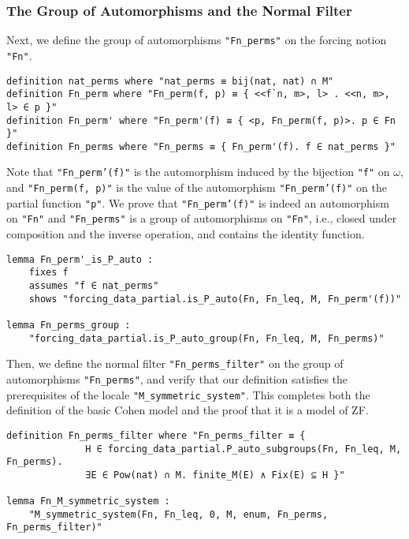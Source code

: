 \documentclass{report}
\newenvironment{isaframe}{\begin{mdframed}[topline=false, rightline=false, bottomline=false]}{\end{mdframed}}
\begin{document}
\subsubsection{The Group of Automorphisms and the Normal Filter}
Next, we define the group of automorphisms \texttt{"Fn\_perms"} on the forcing notion \texttt{"Fn"}.
\begin{isaframe}
\begin{verbatim}
definition nat_perms where "nat_perms ≡ bij(nat, nat) ∩ M" 
definition Fn_perm where "Fn_perm(f, p) ≡ { <<f`n, m>, l> . <<n, m>, l> ∈ p }" 
definition Fn_perm' where "Fn_perm'(f) ≡ { <p, Fn_perm(f, p)>. p ∈ Fn }" 
definition Fn_perms where "Fn_perms ≡ { Fn_perm'(f). f ∈ nat_perms }" 
\end{verbatim}
\end{isaframe}
Note that \texttt{"Fn\_perm'(f)"} is the automorphism induced by the bijection \texttt{"f"} on $\omega$,
and \texttt{"Fn\_perm(f, p)"} is the value of the automorphism \texttt{"Fn\_perm'(f)"} on the partial function \texttt{"p"}.
We prove that \texttt{"Fn\_perm'(f)"} is indeed an automorphism on \texttt{"Fn"} and 
\texttt{"Fn\_perms"} is a group of automorphisms on \texttt{"Fn"},
i.e., closed under composition and the inverse operation, and contains the identity function.

\begin{isaframe}
\begin{verbatim}
lemma Fn_perm'_is_P_auto : 
    fixes f 
    assumes "f ∈ nat_perms" 
    shows "forcing_data_partial.is_P_auto(Fn, Fn_leq, M, Fn_perm'(f))"

lemma Fn_perms_group : 
    "forcing_data_partial.is_P_auto_group(Fn, Fn_leq, M, Fn_perms)" 
\end{verbatim}
\end{isaframe}

Then, we define the normal filter \texttt{"Fn\_perms\_filter"} on the group of automorphisms \texttt{"Fn\_perms"},
and verify that our definition satisfies the prerequisites of the locale \texttt{"M\_symmetric\_system"}.
This completes both the definition of the basic Cohen model and
the proof that it is a model of ZF.

\begin{isaframe}
\begin{verbatim}
definition Fn_perms_filter where "Fn_perms_filter ≡ { 
              H ∈ forcing_data_partial.P_auto_subgroups(Fn, Fn_leq, M, Fn_perms).  
              ∃E ∈ Pow(nat) ∩ M. finite_M(E) ∧ Fix(E) ⊆ H }" 

lemma Fn_M_symmetric_system : 
    "M_symmetric_system(Fn, Fn_leq, 0, M, enum, Fn_perms, Fn_perms_filter)" 
\end{verbatim}
\end{isaframe}
\end{document}
